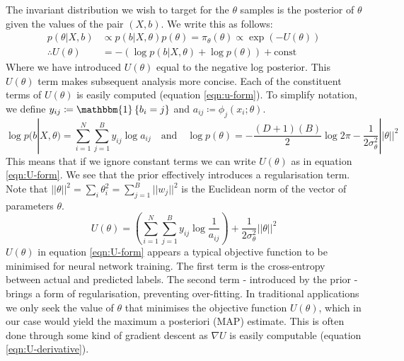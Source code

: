 \documentclass{article}
\newcommand{\one}{\mathbbm{1}}
\begin{document}
The invariant distribution we wish to target for the $\theta$ samples is the posterior of $\theta$ given the values of the pair $(X, b)$. We write this as follows:
%
\begin{align}
	p(\theta | X, b) &\propto p(b | X, \theta) p(\theta) = \pi_\theta (\theta) \propto  \exp \left( - U(\theta) \right) \\
	\therefore U(\theta) &= - \left( \log p(b | X, \theta) + \log p(\theta) \right) + \textrm{const}
\end{align}
%
Where we have introduced $U(\theta)$ equal to the negative log posterior. This $U(\theta)$ term makes subsequent analysis more concise. Each of the constituent terms of $U(\theta)$ is easily computed (equation \ref{eqn:u-form}). To simplify notation, we define $y_{ij} \coloneqq \one \left\{ b_i = j \right\}$ and $a_{ij} \coloneqq \phi_j(x_i; \theta)$.
%
\begin{equation}
	\log p(b | X, \theta) = \sum_{i=1}^{N} \sum_{j=1}^{B} y_{ij} \log a_{ij}  \quad \textrm{and} \quad
	\log p(\theta) = -\frac{(D+1)(B)}{2} \log 2\pi - \frac{1}{2 \sigma_\theta^2} || \theta ||^2
	\label{eqn:U-constituent-terms}
\end{equation}
%
This means that if we ignore constant terms we can write $U(\theta)$ as in equation \ref{eqn:U-form}. We see that the prior effectively introduces a regularisation term. Note that $||\theta||^2 = \sum_{i} \theta_{i}^2 = \sum_{j=1}^{B} ||w_j||^2$ is the Euclidean norm of the vector of parameters $\theta$.
%
\begin{equation}
	U(\theta) = \left( \sum_{i=1}^{N} \sum_{j=1}^{B} y_{ij} \log \frac{1}{a_{ij}} \right)
	+ \frac{1}{2\sigma_\theta^2} ||\theta||^2
	\label{eqn:U-form}
\end{equation}
%
$U(\theta)$ in equation \ref{eqn:U-form} appears a typical objective function to be minimised for neural network training. The first term is the cross-entropy between actual and predicted labels. The second term - introduced by the prior - brings a form of regularisation, preventing over-fitting. In traditional applications we only seek the value of $\theta$ that minimises the objective function $U(\theta)$, which in our case would yield the maximum a posteriori (MAP) estimate. This is often done through some kind of gradient descent as $\nabla U$ is easily computable (equation \ref{eqn:U-derivative}).
\end{document}
